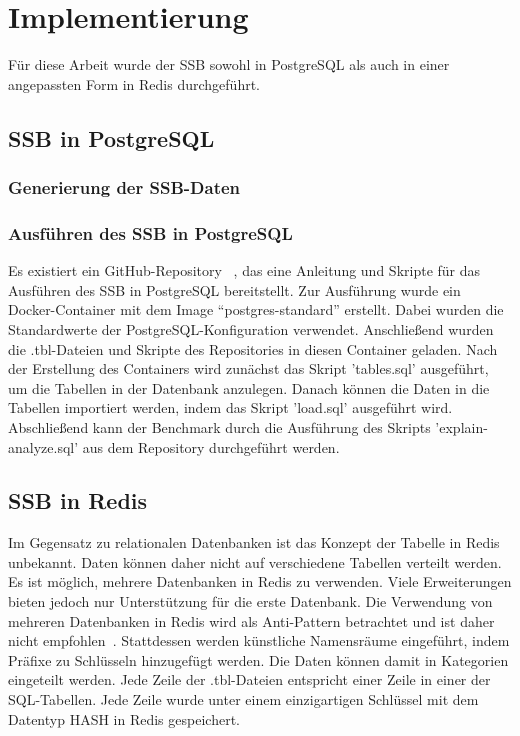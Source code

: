 \chapter{Implementierung}
Für diese Arbeit wurde der \acl{SSB} sowohl in PostgreSQL als auch in einer angepassten Form in Redis durchgeführt.
\section{\acl{SSB} in PostgreSQL}
\subsection{Generierung der \acs{SSB}-Daten}

\subsection{Ausführen des \acl{SSB} in PostgreSQL}

Es existiert ein GitHub-Repository ~\cite{nukoyokohama_ssb-postgres_2023}, das eine Anleitung und Skripte für das Ausführen des \ac{SSB} in PostgreSQL bereitstellt.
Zur Ausführung wurde ein Docker-Container mit dem Image \enquote{postgres-standard} erstellt.
Dabei wurden die Standardwerte der PostgreSQL-Konfiguration verwendet.
Anschließend wurden die .tbl-Dateien und Skripte des Repositories in diesen Container geladen. %
Nach der Erstellung des Containers wird zunächst das Skript 'tables.sql' ausgeführt, um die Tabellen in der Datenbank anzulegen.
Danach können die Daten in die Tabellen importiert werden, indem das Skript 'load.sql' ausgeführt wird.
Abschließend kann der Benchmark durch die Ausführung des Skripts 'explain-analyze.sql' aus dem Repository durchgeführt werden.

\section{\acs{SSB} in Redis}
Im Gegensatz zu relationalen Datenbanken ist das Konzept der Tabelle in Redis unbekannt.
Daten können daher nicht auf verschiedene Tabellen verteilt werden.
Es ist möglich, mehrere Datenbanken in Redis zu verwenden. Viele Erweiterungen bieten jedoch nur Unterstützung für die erste Datenbank.
Die Verwendung von mehreren Datenbanken in Redis wird als Anti-Pattern betrachtet und ist daher nicht empfohlen~\cite{prickett_answer_2022}.
Stattdessen werden künstliche Namensräume eingeführt, indem Präfixe zu Schlüsseln hinzugefügt werden.
Die Daten können damit in Kategorien eingeteilt werden.
Jede Zeile der .tbl-Dateien entspricht einer Zeile in einer der SQL-Tabellen.
Jede Zeile wurde unter einem einzigartigen Schlüssel mit dem Datentyp HASH in Redis gespeichert.

